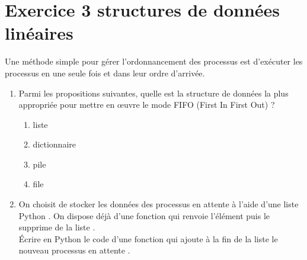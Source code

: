 \documentclass[a4paper,12pt,french]{book}
\begin{document}
\section*{Exercice 3 \small{\hfill structures de données linéaires}}

    Une méthode simple pour gérer l'ordonnancement des processus est d'exécuter les processus en une seule fois et dans leur ordre d'arrivée.\\

    \begin{enumerate}[\bfseries 1.]
        \item Parmi les propositions suivantes, quelle est la structure de données la plus appropriée pour mettre en œuvre le mode FIFO (First In First Out) ?
        \begin{enumerate}[\bfseries a.]
            \item liste
            \item dictionnaire
            \item pile
            \item file
        \end{enumerate}
        \item On choisit de stocker les données des processus en attente à l'aide d'une liste Python . On dispose déjà d'une fonction  qui renvoie l'élément  puis le supprime de la liste .\\

        Écrire en Python le code d'une fonction  qui ajoute à la fin de la liste  le nouveau processus en attente .


\end{enumerate}
\end{document}

